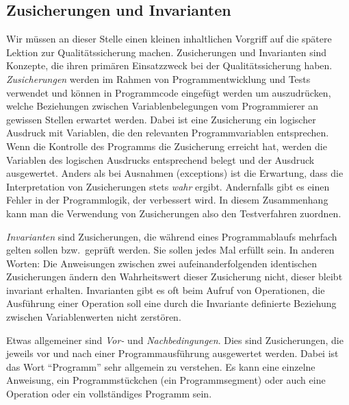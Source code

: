 \subsection{Zusicherungen und Invarianten}
\label{sec:Kap-9.2.1}

Wir müssen an dieser Stelle einen kleinen inhaltlichen Vorgriff auf die spätere Lektion zur Qualitätssicherung machen. Zusicherungen und Invarianten sind Konzepte, die ihren primären Einsatzzweck bei der Qualitätssicherung haben.  \textit{Zusicherungen} werden im Rahmen von Programmentwicklung und Tests verwendet und können in Programmcode eingefügt werden um auszudrücken, welche Beziehungen zwischen Variablenbelegungen vom Programmierer an gewissen Stellen erwartet werden. Dabei ist eine Zusicherung ein logischer Ausdruck mit Variablen, die den relevanten Programmvariablen entsprechen. Wenn die Kontrolle des Programms die Zusicherung erreicht hat, werden die Variablen des logischen Ausdrucks entsprechend belegt und der Ausdruck ausgewertet. Anders als bei Ausnahmen (exceptions) ist die Erwartung, dass die Interpretation von Zusicherungen stets \textit{wahr} ergibt. 
Andernfalls gibt es einen Fehler in der Programmlogik, der verbessert wird. In diesem Zusammenhang kann man die Verwendung von Zusicherungen also den Testverfahren zuordnen. 

\textit{Invarianten}  sind Zusicherungen, die während eines Programmablaufs mehrfach gelten sollen bzw.\ geprüft werden. Sie sollen jedes Mal erfüllt sein. In anderen Worten: Die Anweisungen zwischen zwei aufeinanderfolgenden identischen Zusicherungen ändern den Wahrheitswert dieser Zusicherung nicht, dieser bleibt invariant erhalten. Invarianten gibt es oft beim Aufruf von Operationen, die Ausführung einer Operation soll eine durch die Invariante definierte Beziehung zwischen Variablenwerten nicht zerstören.

Etwas allgemeiner sind \textit{Vor-} und \textit{Nachbedingungen}. Dies sind Zusicherungen, die jeweils vor und nach einer Programmausführung ausgewertet werden. Dabei ist das Wort "`Programm"' sehr allgemein zu verstehen. Es kann eine einzelne Anweisung, ein Programmstückchen (ein Programmsegment) oder auch eine Operation oder ein vollständiges Programm sein. 

